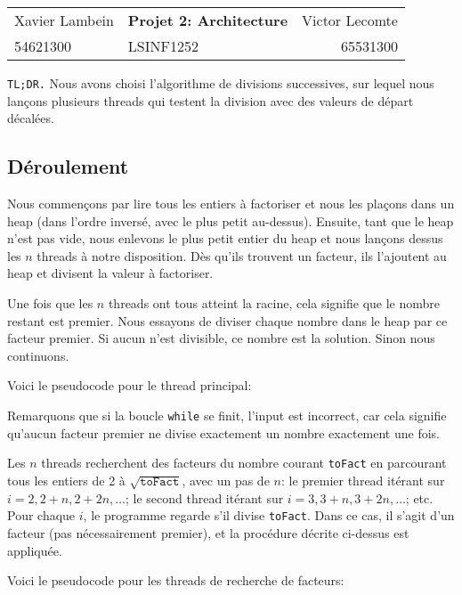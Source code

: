 \documentclass[a4paper,10pt]{article}
\begin{document}
\begin{center}
\begin{tabu} to \textwidth {lX[c]r}
    Xavier Lambein & \large{\textbf{Projet 2: Architecture}} & Victor Lecomte \\
    54621300 & LSINF1252 & 65531300 \\
    \hline
\end{tabu}
\end{center}

\vspace{0.7cm}

\texttt{TL;DR.} Nous avons choisi l'algorithme de divisions successives, sur lequel nous lançons plusieurs threads qui testent la division avec des valeurs de départ décalées.

\subsection*{Déroulement}

Nous commençons par lire tous les entiers à factoriser et nous les plaçons dans un heap (dans l'ordre inversé, avec le plus petit au-dessus). Ensuite, tant que le heap n'est pas vide, nous enlevons le plus petit entier du heap et nous lançons dessus les $n$ threads à notre disposition. Dès qu'ils trouvent un facteur, ils l'ajoutent au heap et divisent la valeur à factoriser.

Une fois que les $n$ threads ont tous atteint la racine, cela signifie que le nombre restant est premier. Nous essayons de diviser chaque nombre dans le heap par ce facteur premier. Si aucun n'est divisible, ce nombre est la solution. Sinon nous continuons.

Voici le pseudocode pour le thread principal:



Remarquons que si la boucle \texttt{while} se finit, l'input est incorrect, car cela signifie qu'aucun facteur premier ne divise exactement un nombre exactement une fois.

Les $n$ threads recherchent des facteurs du nombre courant \texttt{toFact} en parcourant tous les entiers de 2 à $\sqrt{\texttt{toFact}}$, avec un pas de $n$: le premier thread itérant sur $i=2,2+n,2+2n,\dots$; le second thread itérant sur $i=3,3+n,3+2n,\dots$; etc. Pour chaque $i$, le programme regarde s'il divise \texttt{toFact}. Dans ce cas, il s'agit d'un facteur (pas nécessairement premier), et la procédure décrite ci-dessus est appliquée.

Voici le pseudocode pour les threads de recherche de facteurs:
\end{document}
